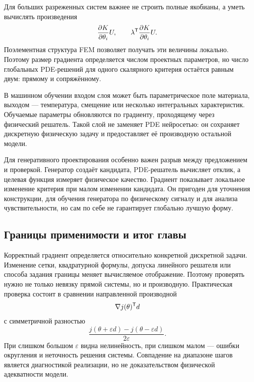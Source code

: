 Для больших разреженных систем важнее не строить полные якобианы, а уметь вычислять произведения
\[
 \frac{\partial K}{\partial \theta_i}U,
 \qquad
 \lambda^{\mathsf{T}}\frac{\partial K}{\partial \theta_i}U.
\]
Поэлементная структура FEM позволяет получать эти величины локально. Поэтому размер градиента определяется числом проектных параметров, но число глобальных PDE-решений для одного скалярного критерия остаётся равным двум: прямому и сопряжённому.

\begin{mlconnection}
В машинном обучении входом слоя может быть параметрическое поле материала, выходом --- температура, смещение или несколько интегральных характеристик. Обучаемые параметры обновляются по градиенту, проходящему через физический решатель. Такой слой не заменяет PDE нейросетью: он сохраняет дискретную физическую задачу и предоставляет её производную остальной модели.
\end{mlconnection}

Для генеративного проектирования особенно важен разрыв между предложением и проверкой. Генератор создаёт кандидата, PDE-решатель вычисляет отклик, а целевая функция измеряет физическое качество. Градиент показывает локальное изменение критерия при малом изменении кандидата. Он пригоден для уточнения конструкции, для обучения генератора по физическому сигналу и для анализа чувствительности, но сам по себе не гарантирует глобально лучшую форму.

\subsection{Границы применимости и итог главы}

Корректный градиент определяется относительно конкретной дискретной задачи. Изменение сетки, квадратурной формулы, допуска линейного решателя или способа задания границы меняет вычисляемое отображение. Поэтому проверять нужно не только невязку прямой системы, но и производную. Практическая проверка состоит в сравнении направленной производной
\begin{equation}
\label{eq:directional-gradient-check-v06}
 \nabla j(\theta)^{\mathsf{T}}d
\end{equation}
с симметричной разностью
\begin{equation}
\label{eq:finite-difference-gradient-check-v06}
 \frac{j(\theta+\varepsilon d)-j(\theta-\varepsilon d)}{2\varepsilon}.
\end{equation}
При слишком большом $\varepsilon$ видна нелинейность, при слишком малом --- ошибки округления и неточность решения системы. Совпадение на диапазоне шагов является диагностикой реализации, но не доказательством физической адекватности модели.

